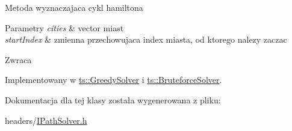 Metoda wyznaczajaca cykl hamiltona


\begin{DoxyParams}{Parametry}
{\em cities} & vector miast \\
\hline
{\em start\+Index} & zmienna przechowujaca index miasta, od ktorego nalezy zaczac \\
\hline
\end{DoxyParams}
\begin{DoxyReturn}{Zwraca}

\end{DoxyReturn}


Implementowany w \mbox{\hyperlink{classts_1_1_greedy_solver_aa529740e0eaaadcd725e0ce23a34542f}{ts\+::\+Greedy\+Solver}} i \mbox{\hyperlink{classts_1_1_bruteforce_solver_aeacf43058fd0498a2789ddcf091a42eb}{ts\+::\+Bruteforce\+Solver}}.



Dokumentacja dla tej klasy została wygenerowana z pliku\+:\begin{DoxyCompactItemize}
\item 
headers/\mbox{\hyperlink{_i_path_solver_8h}{I\+Path\+Solver.\+h}}\end{DoxyCompactItemize}
